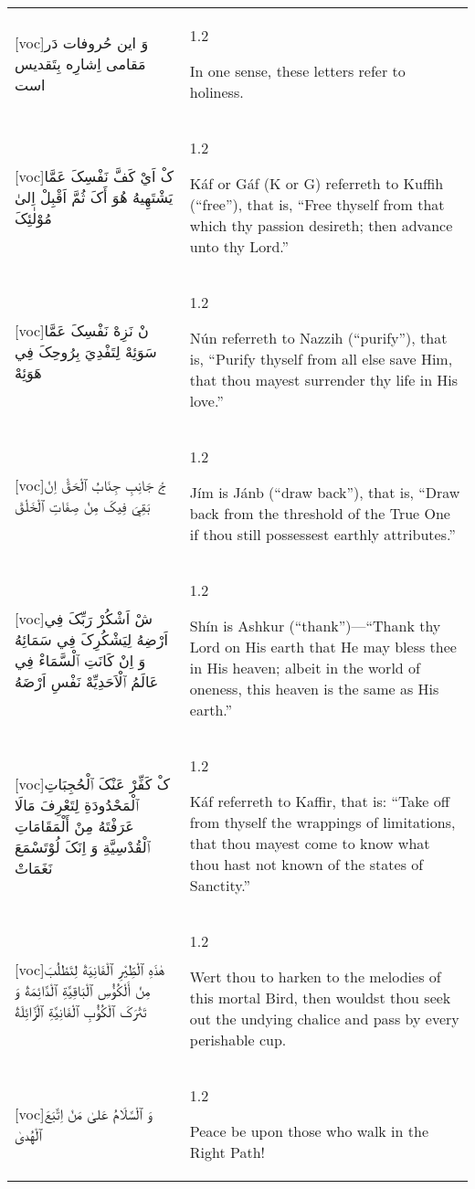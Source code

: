 \documentclass[11pt]{article}
\makeatletter
\newenvironment{orig}
  {\begin{farsi}[voc]}
  {\end{farsi}}
\newenvironment{trans}
  {\Large\begin{spacing}{1.2}\raggedright\vspace{1.75ex}}
  {\end{spacing}\vspace{-1ex}}
\newenvironment{word}
  {\begin{longtable}[t]{p{2.75in}@{\hspace{3em}}p{2.875in}}}
  {\end{longtable}}
\newcommand{\ayat}[2]{\begin{orig}#1\end{orig} & \begin{trans}#2\end{trans}}
\makeatother
\begin{document}
\begin{word}
\ayat{وَ اين حُروفات دَر مَقامی اِشارِه بِتَقديس است}
     {In one sense, these letters refer to holiness.}
     \\
\ayat{کْ اَيْ کَفَّ نَفْسِکَ عَمَّا يَشْتَهِيهُ هُوَ أَکَ ثُمَّ اَقْبِلْ اِلىٰ مُوْلٰئِکَ}
     {Káf or Gáf (K or G) referreth to Kuffih (“free”), that is, “Free thyself from that which thy passion desireth; then advance unto thy Lord.”}
     \\
\ayat{نْ نَزِهْ نَفْسِکَ عَمَّا سَوَئِهْ لِتَفْدِيَ بِرُوحِکَ فِي هَوَئِهْ}
     {Nún referreth to Nazzih (“purify”), that is, “Purify thyself from all else save Him, that thou mayest surrender thy life in His love.”}
     \\
\ayat{جْ جَانِبِ جِنَابُ ٱلْحَقّْ اِنْ بَقِيَ فِيکَ مِنْ صِفَاتِ ٱلْخَلْقْ}
     {Jím is Jánb (“draw back”), that is, “Draw back from the threshold of the True One if thou still possessest earthly attributes.”}
     \\
\ayat{شْ اَشْکُرْ رَبِّکَ فِي اَرْضِهُ لِيَشْکُرِکَ فِي سَمَائِهُ وَ اِنْ کَانَتِ ٱلْسَّمَاءْ فِي عَالَمُ ٱلْاَحَدِيِّهْ نَفْسِ اَرْضَهُ}
     {Shín is Ashkur (“thank”)—“Thank thy Lord on His earth that He may bless thee in His heaven; albeit in the world of oneness, this heaven is the same as His earth.”}
     \\
\ayat{کْ کَفِّرْ عَنْکَ ٱلْحُجِبَاتِ ٱلْمَحْدُودَةِ لِتَعْرِفَ مَالَا عَرَفْتَهُ مِنْ أَلْمَقَامَاتِ ٱلْقُدْسِيَّةِ وَ اِنَکَ لُوْتَسْمَعَ نَغَمَاتْ}
     {Káf referreth to Kaffir, that is: “Take off from thyself the wrappings of limitations, that thou mayest come to know what thou hast not known of the states of Sanctity.”}
     \\
\ayat{هٰذَهِ ٱلْطِّيْرِ ٱلْفَانِيَةْ لِتَطْلُبَ مِنْ أَلْکُؤُسِ ٱلْبَاقِيَّةِ ٱلْدَّائِمَةْ وَ تَتْرَکَ ٱلْکُؤُبِ ٱلْفَانِيَّةِ ٱلْزَّائِلَةْ}
     {Wert thou to harken to the melodies of this mortal Bird, then wouldst thou seek out the undying chalice and pass by every perishable cup.}
     \\
\ayat{وَ ٱلْسَّلَامُ عَلىٰ مَنْ اِتَّبَعَ ٱلْهُدىٰ}
     {Peace be upon those who walk in the Right Path!}
     \\
\end{word}
\end{document}
